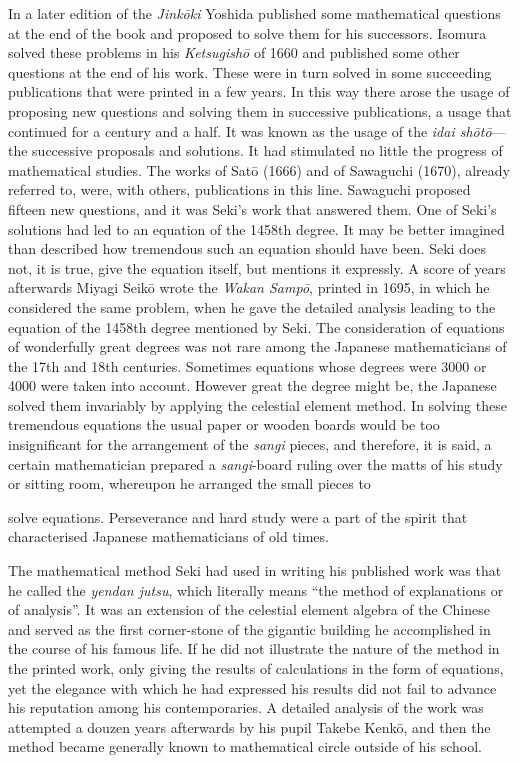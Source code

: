 \documentclass[11pt]{article}
\newcommand{\scanpage}[2]{\clearpage\setcounter{footnote}{0}\noindent{\footnotesize\color{gray}PDF page #1 · #2}\par\medskip}
\newcommand{\scanfooter}{}
\begin{document}
In a later edition of the \emph{Jinkōki} Yoshida published some mathematical questions at the end of the book and proposed to solve them for his successors. Isomura solved these problems in his \emph{Ketsugishō} of 1660 and published some other questions at the end of his work. These were in turn solved in some succeeding publications that were printed in a few years. In this way there arose the usage of proposing new questions and solving them in successive publications, a usage that continued for a century and a half. It was known as the usage of the \emph{idai shōtō}---the successive proposals and solutions. It had stimulated no little the progress of mathematical studies. The works of Satō (1666) and of Sawaguchi (1670), already referred to, were, with others, publications in this line. Sawaguchi proposed fifteen new questions, and it was Seki's work that answered them. One of Seki's solutions had led to an equation of the 1458th degree. It may be better imagined than described how tremendous such an equation should have been. Seki does not, it is true, give the equation itself, but mentions it expressly. A score of years afterwards Miyagi Seikō wrote the \emph{Wakan Sampō}, printed in 1695, in which he considered the same problem, when he gave the detailed analysis leading to the equation of the 1458th degree mentioned by Seki. The consideration of equations of wonderfully great degrees was not rare among the Japanese mathematicians of the 17th and 18th centuries. Sometimes equations whose degrees were 3000 or 4000 were taken into account. However great the degree might be, the Japanese solved them invariably by applying the celestial element method. In solving these tremendous equations the usual paper or wooden boards would be too insignificant for the arrangement of the \emph{sangi} pieces, and therefore, it is said, a certain mathematician prepared a \emph{sangi}-board ruling over the matts of his study or sitting room, whereupon he arranged the small pieces to
\scanfooter

\scanpage{0174}{Chapter 22, printed page 160}
solve equations. Perseverance and hard study were a part of the spirit that characterised Japanese mathematicians of old times.

The mathematical method Seki had used in writing his published work was that he called the \emph{yendan jutsu}, which literally means ``the method of explanations or of analysis''. It was an extension of the celestial element algebra of the Chinese and served as the first corner-stone of the gigantic building he accomplished in the course of his famous life. If he did not illustrate the nature of the method in the printed work, only giving the results of calculations in the form of equations, yet the elegance with which he had expressed his results did not fail to advance his reputation among his contemporaries. A detailed analysis of the work was attempted a douzen years afterwards by his pupil Takebe Kenkō, and then the method became generally known to mathematical circle outside of his school.
\end{document}

